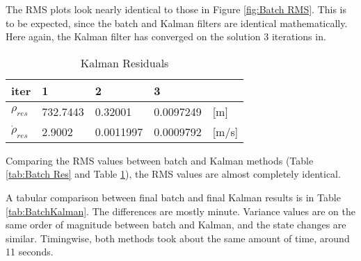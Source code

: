 \documentclass[12pt,a4paper,oneside]{article}
\numberwithin{equation}{section}   		%
\begin{document}
The RMS plots look nearly identical to those in Figure \ref{fig:Batch RMS}. This is to be expected, since the batch and Kalman filters are identical mathematically. Here again, the Kalman filter has converged on the solution 3 iterations in. 

\begin{table}[H]
\centering
	\begin{tabular}{|l|l|l|l|l|}
		\hline
		iter&1&2&3& \\\hline
		$\rho_{res}$		&	732.7443	&	0.32001		&	0.0097249	& [m]		\\\hline
		$\dot{\rho}_{res}$	&	2.9002	&	0.0011997	&	0.0009792	& [m/s] 	\\\hline
	\end{tabular}
	\caption{Kalman Residuals}
	\label{tab:Kalman Res}
\end{table}

Comparing the RMS values between batch and Kalman methods (Table \ref{tab:Batch Res} and Table \ref{tab:Kalman Res}), the RMS values are almost completely identical.

A tabular comparison between final batch and final Kalman results is in Table \ref{tab:BatchKalman}. The differences are mostly minute. Variance values are on the same order of magnitude between batch and Kalman, and the state changes are similar. Timingwise, both methods took about the same amount of time, around 11 seconds. 
\end{document}
